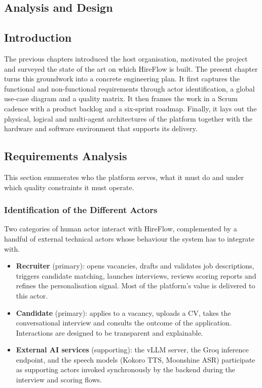 \begin{center}
    \chapter{Analysis and Design}
\end{center}
\label{chap:analysisdesign}

\section*{Introduction}

The previous chapters introduced the host organisation, motivated the
project and surveyed the state of the art on which HireFlow is built.
The present chapter turns this groundwork into a concrete engineering
plan. It first captures the functional and non-functional requirements
through actor identification, a global use-case diagram and a quality
matrix. It then frames the work in a Scrum cadence with a product
backlog and a six-sprint roadmap. Finally, it lays out the physical,
logical and multi-agent architectures of the platform together with
the hardware and software environment that supports its delivery.

\section{Requirements Analysis}

This section enumerates who the platform serves, what it must do and
under which quality constraints it must operate.

\subsection{Identification of the Different Actors}

Two categories of human actor interact with HireFlow, complemented
by a handful of external technical actors whose behaviour the system
has to integrate with.
\begin{itemize}
    \item \textbf{Recruiter} (primary): opens vacancies, drafts and
    validates job descriptions, triggers candidate matching, launches
    interviews, reviews scoring reports and refines the personalisation
    signal. Most of the platform's value is delivered to this actor.
    \item \textbf{Candidate} (primary): applies to a vacancy, uploads a
    \acs{CV}, takes the conversational interview and consults the
    outcome of the application. Interactions are designed to be
    transparent and explainable.
    \item \textbf{External \acs{AI} services} (supporting): the vLLM
    server, the Groq inference endpoint, and the speech models
    (Kokoro \acs{TTS}, Moonshine \acs{ASR}) participate as
    supporting actors invoked synchronously by the backend during the
    interview and scoring flows.
\end{itemize}

